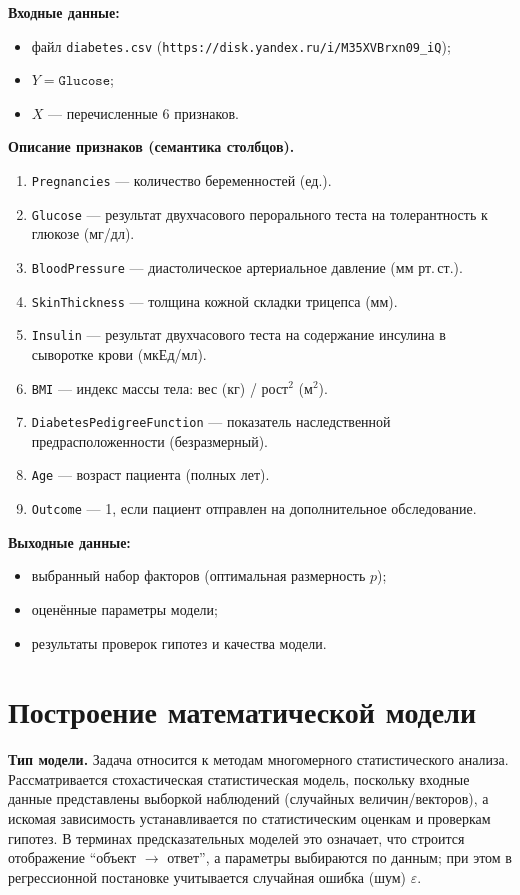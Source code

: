 \documentclass[a4paper, 14pt]{extarticle}
\begin{document}
\textbf{Входные данные:}
\begin{itemize}
  \item файл \texttt{diabetes.csv} (\texttt{https://disk.yandex.ru/i/M35XVBrxn09\_iQ});
  \item $Y=\texttt{Glucose}$;
  \item $X$ --- перечисленные 6 признаков.
\end{itemize}

\textbf{Описание признаков (семантика столбцов).}
\begin{enumerate}
  \item \texttt{Pregnancies} --- количество беременностей (ед.).
  \item \texttt{Glucose} --- результат двухчасового перорального теста на толерантность к глюкозе (мг/дл).
  \item \texttt{BloodPressure} --- диастолическое артериальное давление (мм рт.\,ст.).
  \item \texttt{SkinThickness} --- толщина кожной складки трицепса (мм).
  \item \texttt{Insulin} --- результат двухчасового теста на содержание инсулина в сыворотке крови (мкЕд/мл).
  \item \texttt{BMI} --- индекс массы тела: вес (кг) / рост$^2$ (м$^2$).
  \item \texttt{DiabetesPedigreeFunction} --- показатель наследственной предрасположенности (безразмерный).
  \item \texttt{Age} --- возраст пациента (полных лет).
  \item \texttt{Outcome} --- 1, если пациент отправлен на дополнительное обследование.
\end{enumerate}

\textbf{Выходные данные:}
\begin{itemize}
  \item выбранный набор факторов (оптимальная размерность $p$);
  \item оценённые параметры модели;
  \item результаты проверок гипотез и качества модели.
\end{itemize}

\section{Построение математической модели}

\textbf{Тип модели.} Задача относится к методам многомерного статистического анализа. Рассматривается стохастическая статистическая модель, поскольку входные данные представлены выборкой наблюдений (случайных величин/векторов), а искомая зависимость устанавливается по статистическим оценкам и проверкам гипотез. В терминах предсказательных моделей это означает, что строится отображение ``объект $\to$ ответ'', а параметры выбираются по данным; при этом в регрессионной постановке учитывается случайная ошибка (шум) $\varepsilon$.
\end{document}
